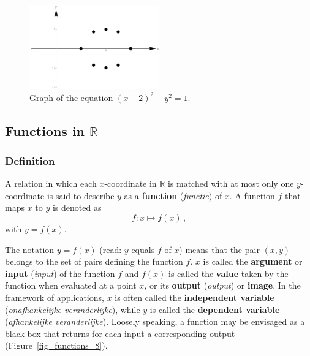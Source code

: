 \begin{example}
\begin{figure}[H]
	\begin{center}
			\includegraphics[width=0.5\textwidth]{fig_functions_7}
	\caption{Graph of the equation $(x-2)^2 + y^2 = 1$.}
	\label{fig_functions_7}
	\end{center}
\end{figure}

\end{example}
\fi

\subsection{Functions in $\mathbb{R}$}\label{functies_R}
\subsubsection{Definition}

\begin{definition}[Function]
\label{def_function}

A relation in which each $x$-coordinate in $\mathbb{R}$ is matched with at most only one $y$-coordinate is said to describe $y$ as a \textbf{function} (\textit{functie}) of $x$. A function $f$ that maps $x$ to $y$ is denoted as
$$
f: x\mapsto f(x)\,,
$$
with  $y = f ( x )$.
\end{definition}
The notation $y = f ( x )$ (read: $y$ equals $f$ of $x$) means that the pair $(x, y)$ belongs to the set of pairs defining the function $f$. $x$ is called the \textbf{argument} or \textbf{input} (\textit{input}) of the function $f$ and $f (x)$ is called the \textbf{value} taken by the function when evaluated at a point $x$, or its \textbf{output} (\textit{output}) or \textbf{image}. In the framework of applications, $x$ is often called the \textbf{independent variable} (\textit{onafhankelijke veranderlijke}), while $y$ is called the \textbf{dependent variable} (\textit{afhankelijke veranderlijke}). 
Loosely speaking, a function may be envisaged as a black box that returns for each input a corresponding output (Figure~\ref{fig_functions_8}). 


